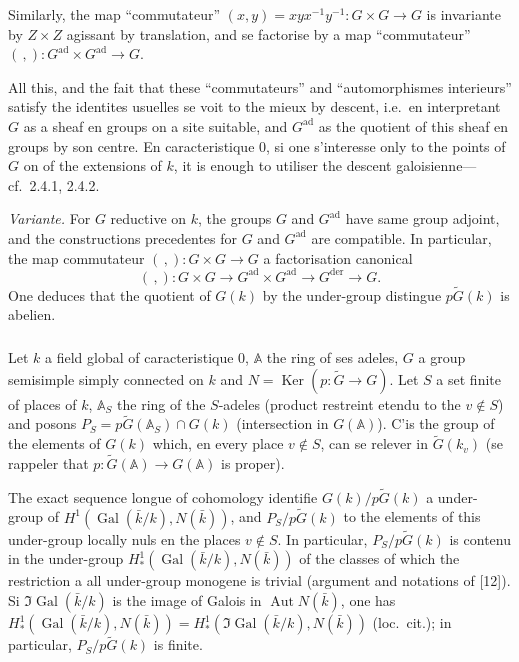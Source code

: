 \documentclass[12pt,a4paper]{article}
\theoremstyle{plain}
\theoremstyle{definition}
\theoremstyle{remark}
\DeclareMathOperator{\Gal}{Gal}
\DeclareMathOperator{\Ker}{Ker}
\DeclareMathOperator{\Aut}{Aut}
\newcommand{\A}{\mathbb{A}}
\begin{document}
Similarly, the map ``commutateur'' $(x,y) = xyx^{-1}y^{-1}: G \times G \to G$ is invariante by $Z \times Z$ agissant by translation, and se factorise by a map ``commutateur'' $(\,,): G^{\text{ad}} \times G^{\text{ad}} \to G$.

All this, and the fait that these ``commutateurs'' and ``automorphismes interieurs'' satisfy the identites usuelles se voit to the mieux by descent, i.e.~en interpretant $G$ as a sheaf en groups on a site suitable, and $G^{\text{ad}}$ as the quotient of this sheaf en groups by son centre. En caracteristique 0, si one s'interesse only to the points of $G$ on of the extensions of $k$, it is enough to utiliser the descent galoisienne---cf.~2.4.1, 2.4.2.

\textit{Variante.} For $G$ reductive on $k$, the groups $G$ and $G^{\text{ad}}$ have same group adjoint, and the constructions precedentes for $G$ and $G^{\text{ad}}$ are compatible. In particular, the map commutateur $(\,,): G \times G \to G$ a factorisation canonical
\[
(\,,): G \times G \xrightarrow{\;\;} G^{\text{ad}} \times G^{\text{ad}} \xrightarrow{\;\;} G^{\text{der}} \xrightarrow{\;\;} G.
\]
One deduces that the quotient of $G(k)$ by the under-group distingue $p\tilde{G}(k)$ is abelien.

\subsubsection{}

Let $k$ a field global of caracteristique 0, $\A$ the ring of ses adeles, $G$ a group semisimple simply connected on $k$ and $N = \Ker(p:\tilde{G} \to G)$. Let $S$ a set finite of places of $k$, $\A_S$ the ring of the $S$-adeles (product restreint etendu to the $v \notin S$) and posons $P_S = p\tilde{G}(\A_S) \cap G(k)$ (intersection in $G(\A)$). C'is the group of the elements of $G(k)$ which, en every place $v \notin S$, can se relever in $\tilde{G}(k_v)$ (se rappeler that $p:\tilde{G}(\A) \to G(\A)$ is proper).

The exact sequence longue of cohomology identifie $G(k)/p\tilde{G}(k)$ a under-group of $H^1(\Gal(\bar{k}/k), N(\bar{k}))$, and $P_S/p\tilde{G}(k)$ to the elements of this under-group locally nuls en the places $v \notin S$. In particular, $P_S/p\tilde{G}(k)$ is contenu in the under-group $H^1_*(\Gal(\bar{k}/k), N(\bar{k}))$ of the classes of which the restriction a all under-group monogene is trivial (argument and notations of [12]). Si $\Im \Gal(\bar{k}/k)$ is the image of Galois in $\Aut N(\bar{k})$, one has $H^1_*(\Gal(\bar{k}/k), N(\bar{k})) = H^1_*(\Im \Gal(\bar{k}/k), N(\bar{k}))$ (loc.~cit.); in particular, $P_S/p\tilde{G}(k)$ is finite.
\end{document}
